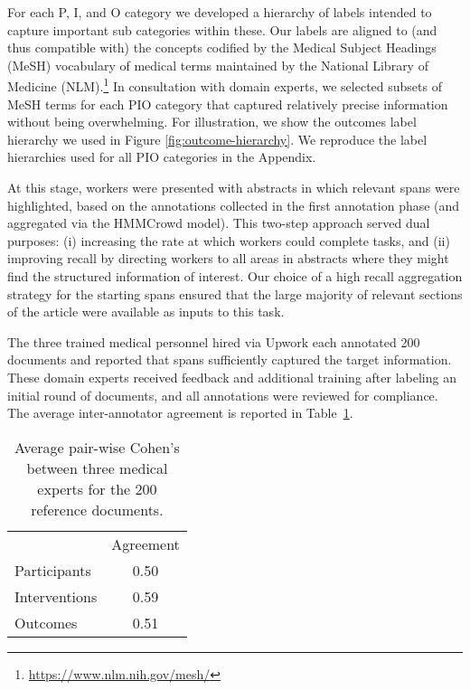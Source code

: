 \documentclass[11pt,a4paper]{article}
\begin{document}
\label{section:corpus-tokens}
For each P, I, and O category we developed a hierarchy of labels intended to capture important sub categories within these.
Our labels are aligned to (and thus compatible with) the concepts codified by the Medical Subject Headings (MeSH) vocabulary of medical terms maintained by the National Library of Medicine (NLM).\footnote{\url{https://www.nlm.nih.gov/mesh/}} In consultation with domain experts, we selected subsets of MeSH terms for each PIO category that captured relatively precise information without being overwhelming. 
For illustration, we show the outcomes label hierarchy we used in Figure \ref{fig:outcome-hierarchy}.
We reproduce the label hierarchies used for all PIO categories in the Appendix. 

At this stage, workers were presented with abstracts in which relevant spans were highlighted, based on the annotations collected in the first annotation phase (and aggregated via the HMMCrowd model).
This two-step approach served dual purposes: (i) increasing the rate at which workers could complete tasks, and (ii) improving recall by directing workers to all areas in abstracts where they might find the structured information of interest. Our choice of a high recall aggregation strategy for the starting spans ensured that the large majority of relevant sections of the article were available as inputs to this task.

The three trained medical personnel hired via Upwork each annotated 200 documents and reported that spans sufficiently captured the target information.
These domain experts received feedback and additional training after labeling an initial round of documents, and all annotations were reviewed for compliance.
The average inter-annotator agreement is reported in Table~\ref{tab:semantic_agreement}.


\begin{table}[h]\centering
    \small
    \begin{tabular}{ l c } 
\textbf{} & Agreement \\
        \cline{2-2}
        Participants  & 0.50 \\
        Interventions & 0.59 \\ 
        Outcomes      & 0.51 \\ 
\end{tabular}
    \caption{Average pair-wise Cohen's  between three medical experts for the 200 reference documents.}
   	\label{tab:semantic_agreement}
\end{table}
\end{document}
